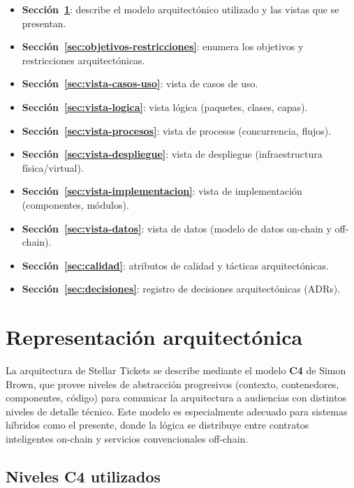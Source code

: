 \documentclass[12pt,oneside]{article}
\begin{document}
\begin{itemize}
  \item \textbf{Sección~\ref{sec:representacion}}: describe el modelo arquitectónico utilizado y las vistas que se presentan.
  \item \textbf{Sección~\ref{sec:objetivos-restricciones}}: enumera los objetivos y restricciones arquitectónicas.
  \item \textbf{Sección~\ref{sec:vista-casos-uso}}: vista de casos de uso.
  \item \textbf{Sección~\ref{sec:vista-logica}}: vista lógica (paquetes, clases, capas).
  \item \textbf{Sección~\ref{sec:vista-procesos}}: vista de procesos (concurrencia, flujos).
  \item \textbf{Sección~\ref{sec:vista-despliegue}}: vista de despliegue (infraestructura física/virtual).
  \item \textbf{Sección~\ref{sec:vista-implementacion}}: vista de implementación (componentes, módulos).
  \item \textbf{Sección~\ref{sec:vista-datos}}: vista de datos (modelo de datos on-chain y off-chain).
  \item \textbf{Sección~\ref{sec:calidad}}: atributos de calidad y tácticas arquitectónicas.
  \item \textbf{Sección~\ref{sec:decisiones}}: registro de decisiones arquitectónicas (ADRs).
\end{itemize}

\FloatBarrier
\clearpage
\section{Representación arquitectónica}
\label{sec:representacion}

La arquitectura de Stellar Tickets se describe mediante el modelo \textbf{C4} de Simon Brown, que provee niveles de abstracción progresivos (contexto, contenedores, componentes, código) para comunicar la arquitectura a audiencias con distintos niveles de detalle técnico. Este modelo es especialmente adecuado para sistemas híbridos como el presente, donde la lógica se distribuye entre contratos inteligentes on-chain y servicios convencionales off-chain.

\subsection{Niveles C4 utilizados}
\end{document}
